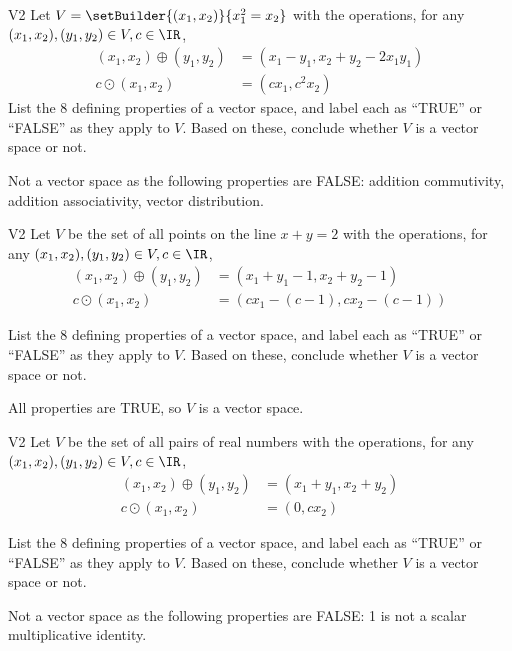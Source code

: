 \begin{problem}{V2}
Let \(V=\setBuilder{ (x_1,x_2)}{x_1^2=x_2}\) with the operations, for any \((x_1,x_2), (y_1,y_2) \in V,c \in \IR\),
\begin{align*}
(x_1,x_2) \oplus (y_1,y_2) &= (x_1-y_1,x_2+y_2-2x_1y_1) \\
c \odot (x_1,x_2) &= (cx_1, c^2x_2)
\end{align*}
  List the 8 defining properties of a vector space, and label each as
  ``TRUE'' or ``FALSE'' as they apply to \(V\). Based on these, conclude whether
  \(V\) is a vector space or not.

\end{problem}
\begin{solution}
Not a vector space as the following properties are FALSE:
addition commutivity, addition associativity, vector distribution.
\end{solution}


 \begin{problem}{V2}
 Let \(V\) be the set of all points on the line \(x+y=2\) with the operations, for any \((x_1,x_2), (y_1,y_2) \in V,c \in \IR\),
 \begin{align*}
 (x_1,x_2) \oplus (y_1,y_2) &= (x_1+y_1-1,x_2+y_2-1) \\
 c \odot (x_1,x_2) &= (cx_1-(c-1), cx_2-(c-1))
 \end{align*}

   List the 8 defining properties of a vector space, and label each as
   ``TRUE'' or ``FALSE'' as they apply to \(V\). Based on these, conclude whether
   \(V\) is a vector space or not.

 \end{problem}
 \begin{solution}
  All properties are TRUE, so
 \(V\) is a vector space.
 \end{solution}

 \begin{problem}{V2}
 Let \(V\) be the set of all pairs of real numbers with the operations, for any \((x_1,x_2), (y_1,y_2) \in V,c \in \IR\),
 \begin{align*}
 (x_1,x_2) \oplus (y_1,y_2) &= (x_1+y_1,x_2+y_2) \\
 c \odot (x_1,x_2) &= (0, cx_2)
 \end{align*}

   List the 8 defining properties of a vector space, and label each as
   ``TRUE'' or ``FALSE'' as they apply to \(V\). Based on these, conclude whether
   \(V\) is a vector space or not.
 \end{problem}
 \begin{solution}
 Not a vector space as the following properties are FALSE: 1 is not a scalar multiplicative identity.
 \end{solution}

